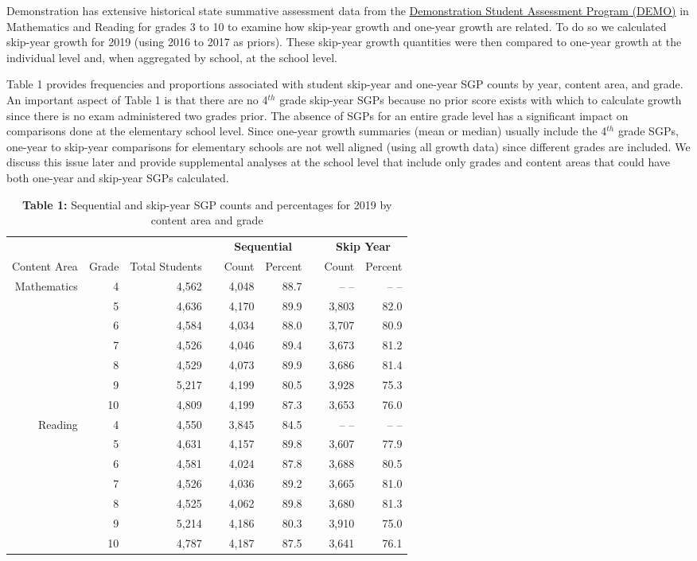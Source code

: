 \documentclass[12pt]{article}
\begin{document}
Demonstration has extensive historical state summative assessment data
from the \href{www.sgp.io}{Demonstration Student Assessment Program
(DEMO)} in Mathematics and Reading for grades 3 to 10 to examine how
skip-year growth and one-year growth are related. To do so we calculated
skip-year growth for 2019 (using 2016 to 2017 as priors). These
skip-year growth quantities were then compared to one-year growth at the
individual level and, when aggregated by school, at the school level.

Table 1 provides frequencies and proportions associated with student
skip-year and one-year SGP counts by year, content area, and grade. An
important aspect of Table 1 is that there are no 4\(^{th}\) grade
skip-year SGPs because no prior score exists with which to calculate
growth since there is no exam administered two grades prior. The absence
of SGPs for an entire grade level has a significant impact on
comparisons done at the elementary school level. Since one-year growth
summaries (mean or median) usually include the 4\(^{th}\) grade SGPs,
one-year to skip-year comparisons for elementary schools are not well
aligned (using all growth data) since different grades are included. We
discuss this issue later and provide supplemental analyses at the school
level that include only grades and content areas that could have both
one-year and skip-year SGPs calculated.

\begin{table}[H]
\caption*{\textbf{Table 1:} Sequential and skip-year SGP counts and percentages for 2019 by content area and grade\label{table1}} 
\begin{center}
\begin{tabular}{rrrcrrcrr}
\hline\hline
\multicolumn{3}{c}{\bfseries }&\multicolumn{1}{c}{\bfseries }&\multicolumn{2}{c}{\bfseries Sequential}&\multicolumn{1}{c}{\bfseries }&\multicolumn{2}{c}{\bfseries Skip Year}\tabularnewline
\cline{5-6} \cline{8-9}
\multicolumn{1}{c}{Content Area}&\multicolumn{1}{c}{Grade}&\multicolumn{1}{c}{Total Students}&\multicolumn{1}{c}{}&\multicolumn{1}{c}{Count}&\multicolumn{1}{c}{Percent}&\multicolumn{1}{c}{}&\multicolumn{1}{c}{Count}&\multicolumn{1}{c}{Percent}\tabularnewline
\hline
Mathematics& 4&4,562&&4,048&88.7&&  --  --  & --  -- \tabularnewline
& 5&4,636&&4,170&89.9&&3,803&82.0\tabularnewline
& 6&4,584&&4,034&88.0&&3,707&80.9\tabularnewline
& 7&4,526&&4,046&89.4&&3,673&81.2\tabularnewline
& 8&4,529&&4,073&89.9&&3,686&81.4\tabularnewline
& 9&5,217&&4,199&80.5&&3,928&75.3\tabularnewline
&10&4,809&&4,199&87.3&&3,653&76.0\tabularnewline
Reading& 4&4,550&&3,845&84.5&&  --  --  & --  -- \tabularnewline
& 5&4,631&&4,157&89.8&&3,607&77.9\tabularnewline
& 6&4,581&&4,024&87.8&&3,688&80.5\tabularnewline
& 7&4,526&&4,036&89.2&&3,665&81.0\tabularnewline
& 8&4,525&&4,062&89.8&&3,680&81.3\tabularnewline
& 9&5,214&&4,186&80.3&&3,910&75.0\tabularnewline
&10&4,787&&4,187&87.5&&3,641&76.1\tabularnewline
\hline
\end{tabular}\end{center}
\end{table}
\end{document}
